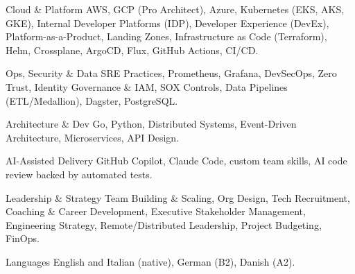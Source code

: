 
\vspace{2.9mm}
\begin{cvskills}

  \cvskill
  {Cloud \& Platform}
  {AWS, GCP (Pro Architect), Azure, Kubernetes (EKS, AKS, GKE), Internal Developer Platforms (IDP), Developer Experience (DevEx), Platform-as-a-Product, Landing Zones, Infrastructure as Code (Terraform), Helm, Crossplane, ArgoCD, Flux, GitHub Actions, CI/CD.}

  \cvskill
  {Ops, Security \& Data}
  {SRE Practices, Prometheus, Grafana, DevSecOps, Zero Trust, Identity Governance \& IAM, SOX Controls, Data Pipelines (ETL/Medallion), Dagster, PostgreSQL.}

  \cvskill
  {Architecture \& Dev}
  {Go, Python, Distributed Systems, Event-Driven Architecture, Microservices, API Design.}

  \cvskill
  {AI-Assisted Delivery}
  {GitHub Copilot, Claude Code, custom team skills, AI code review backed by automated tests.}

  \cvskill
  {Leadership \& Strategy}
  {Team Building \& Scaling, Org Design, Tech Recruitment, Coaching \& Career Development, Executive Stakeholder Management, Engineering Strategy, Remote/Distributed Leadership, Project Budgeting, FinOps.}

  \cvskill
  {Languages}
  {English and Italian (native), German (B2), Danish (A2).}

\end{cvskills}
